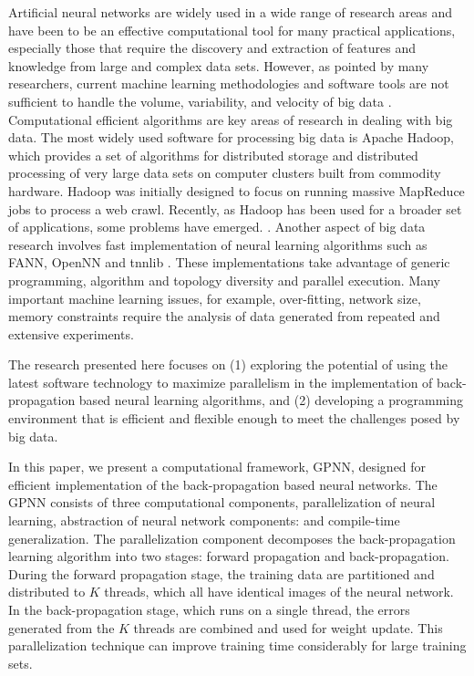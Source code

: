 \documentclass[procedia]{easychair}
\begin{document}
Artificial neural networks are widely used in a wide range of research areas and have been to be an effective computational tool for many practical applications, especially those that require the discovery and extraction of features and knowledge from large and complex data sets.  However, as pointed by many researchers, current machine learning methodologies and software tools are not sufficient to handle the volume, variability, and velocity of big data \cite{fan2013mining, labrinidis2012challenges}.  Computational efficient algorithms are key areas of research in dealing with big data.  The most widely used software for processing big data is Apache Hadoop, which provides a set of algorithms for distributed storage and distributed processing of very large data sets on computer clusters built from commodity hardware.  Hadoop was initially designed to focus on running massive MapReduce jobs to process a web crawl.  Recently, as Hadoop has been used for a broader set of applications, some problems have emerged. \cite{vavilapalli2013apache}.  Another aspect of big data research involves fast implementation of neural learning algorithms such as FANN, OpenNN and tnnlib \cite{nissen2003implementation, lopezopennn}.  These implementations take advantage of generic programming, algorithm and topology diversity and parallel execution. Many important machine learning issues, for example, over-fitting, network size, memory constraints require the analysis of data generated from repeated and extensive experiments.

The research presented here focuses on (1) exploring the potential of using the latest software technology to maximize parallelism in the implementation of back-propagation based neural learning algorithms, and (2) developing a programming environment that is efficient and flexible enough to meet the challenges posed by big data.

In this paper, we present a computational framework, GPNN, designed for efficient implementation of the back-propagation based neural networks. The GPNN consists of three computational components, parallelization of neural learning, abstraction of neural network components: and compile-time generalization.  The parallelization component decomposes the back-propagation learning algorithm into two stages: forward propagation and back-propagation.  During the forward propagation stage, the training data are partitioned and distributed to $K$ threads, which all have identical images of the neural network.  In the back-propagation stage, which runs on a single thread, the errors generated from the $K$ threads are combined and used for weight update.  This parallelization technique can improve training time considerably for large training sets.
\end{document}
